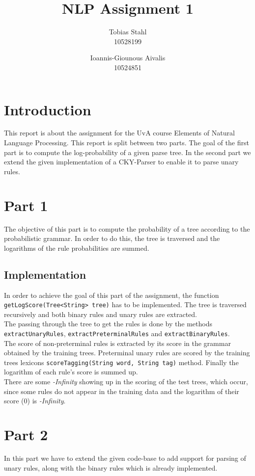\documentclass[11pt]{article}
\title{
	\textbf{NLP Assignment 1}
}
\author{Tobias Stahl \\ 10528199 \and Ioannis-Giounous Aivalis \\ 10524851 }
\begin{document}
\maketitle


\section{Introduction}
This report is about the assignment for the UvA course Elements of Natural Language Processing. This report is split between two parts. The goal of the first part is to compute the log-probability of a given parse tree. In the second part we extend the given implementation of a CKY-Parser to enable it to parse unary rules.\\

\section{Part 1}
The objective of this part is to compute the probability of a tree according to the probabilistic grammar. In order to do this, the tree is traversed and the logarithms of the rule probabilities are summed. 

\subsection{Implementation}
In order to achieve the goal of this part of the assignment, the function \texttt {getLogScore(Tree<String> tree)} has to be implemented. The tree is traversed recursively and both binary rules and unary rules are extracted.\\
The passing through the tree to get the rules is done by the methods \texttt{extractUnaryRules}, \texttt{extractPreterminalRules} and \texttt{extractBinaryRules}.\\
The score of non-preterminal rules is extracted by its score in the grammar obtained by the training trees. Preterminal unary rules are scored by the training trees lexicons \texttt{scoreTagging(String word, String tag)} method.
Finally the logarithm of each rule's score is summed up.\\
There are some \emph{-Infinity} showing up in the scoring of the test trees, which occur, since some rules do not appear in the training data and the logarithm of their score (0) is \emph{-Infinity}.\\

\section{Part 2}
In this part we have to extend the given code-base to add support for parsing of unary rules, along with the binary rules which is already implemented.
\end{document}
